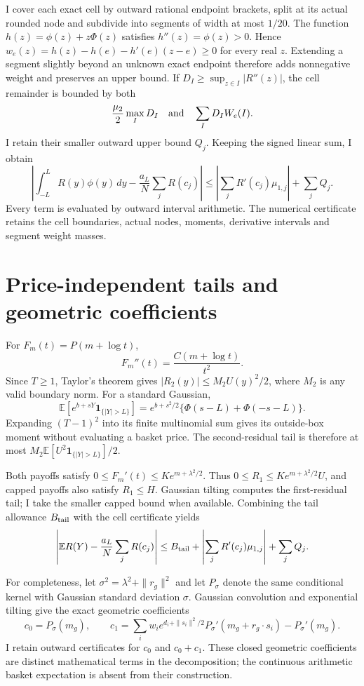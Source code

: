 \documentclass[11pt]{article}
\newcommand{\E}{\mathbb E}
\begin{document}
I cover each exact cell by outward rational endpoint brackets, split at its actual rounded node and subdivide into segments of width at most $1/20$. The function $h(z)=\phi(z)+z\Phi(z)$ satisfies $h''(z)=\phi(z)>0$. Hence $w_e(z)=h(z)-h(e)-h'(e)(z-e)\geq0$ for every real $z$. Extending a segment slightly beyond an unknown exact endpoint therefore adds nonnegative weight and preserves an upper bound. If $D_I\geq\sup_{z\in I}|R''(z)|$, the cell remainder is bounded by both
\[
 \frac{\mu_2}{2}\max_I D_I\quad\hbox{and}\quad \sum_I D_I W_e(I).
\]
I retain their smaller outward upper bound $Q_j$. Keeping the signed linear sum, I obtain
\[
 \left|\int_{-L}^{L}R(y)\phi(y)\,dy-
       \frac{a_L}{N}\sum_j R(c_j)\right|
 \leq\left|\sum_jR'(c_j)\mu_{1,j}\right|+\sum_jQ_j.
\]
Every term is evaluated by outward interval arithmetic. The numerical certificate retains the cell boundaries, actual nodes, moments, derivative intervals and segment weight masses.

\section{Price-independent tails and geometric coefficients}
For $F_m(t)=P(m+\log t)$,
\[
 F_m''(t)=\frac{C(m+\log t)}{t^2}.
\]
Since $T\geq1$, Taylor's theorem gives $|R_2(y)|\leq M_2 U(y)^2/2$, where $M_2$ is any valid boundary norm. For a standard Gaussian,
\[
 \E[e^{b+sY}\mathbf1_{\{|Y|>L\}}]
 =e^{b+s^2/2}\{\Phi(s-L)+\Phi(-s-L)\}.
\]
Expanding $(T-1)^2$ into its finite multinomial sum gives its outside-box moment without evaluating a basket price. The second-residual tail is therefore at most $M_2\E[U^2\mathbf1_{\{|Y|>L\}}]/2$.

Both payoffs satisfy $0\leq F_m'(t)\leq K e^{m+\lambda^2/2}$. Thus $0\leq R_1\leq K e^{m+\lambda^2/2}U$, and capped payoffs also satisfy $R_1\leq H$. Gaussian tilting computes the first-residual tail; I take the smaller capped bound when available. Combining the tail allowance $B_{\rm tail}$ with the cell certificate yields
\[
 \left|\E R(Y)-\frac{a_L}{N}\sum_jR(c_j)\right|
 \leq B_{\rm tail}+\left|\sum_j R'(c_j)\mu_{1,j}\right|+\sum_jQ_j.
\]

For completeness, let $\sigma^2=\lambda^2+\|r_g\|^2$ and let $P_\sigma$ denote the same conditional kernel with Gaussian standard deviation $\sigma$. Gaussian convolution and exponential tilting give the exact geometric coefficients
\[
 c_0=P_\sigma(m_g),\qquad
 c_1=\sum_i w_i e^{d_i+\|s_i\|^2/2}
       P_\sigma'(m_g+r_g\cdot s_i)-P_\sigma'(m_g).
\]
I retain outward certificates for $c_0$ and $c_0+c_1$. These closed geometric coefficients are distinct mathematical terms in the decomposition; the continuous arithmetic basket expectation is absent from their construction.
\end{document}
